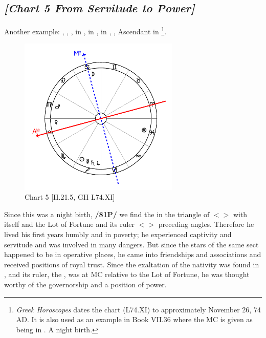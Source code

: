 \subsection*{\textit{[Chart 5 From Servitude to Power]}}

Another example: \Sun, \Mercury, \Saturn, \Jupiter\xspace in \Sagittarius, \Moon\xspace in \Cancer, \Mars\xspace in \Virgo,
\Venus, Ascendant in \Libra
\footnote{\textit{Greek Horoscopes} dates the chart (L74.XI) to approximately November 26, 74 AD. It is also used as an example in Book VII.36 where the MC is given as being in \Cancer. A night birth.}.

\clearpage
\begin{figure}
\centering
\vspace{-20pt}
\includegraphics[width=0.68\textwidth]{charts/2_21_5}
\caption{Chart 5 [II.21.5, GH L74.XI]}
\label{fig:chart05}
\end{figure}

Since this was a night birth, \textbf{/81P/} we find the \Moon\xspace in the triangle of \Mars\xspace $<$\Cancer\xspace \Scorpio\xspace \Pisces$>$ with \Mars\xspace itself and the Lot of Fortune and its ruler $<$\Jupiter$>$ preceding angles.
Therefore he lived his first years humbly and in poverty; he experienced captivity and servitude and was involved in many dangers. But since the stars of the same sect happened to be in operative places, he came into friendships and associations and received positions of royal trust. Since the exaltation of the nativity was found in \Leo, and its ruler, the \Sun, was at MC relative to the Lot of Fortune, he was thought worthy of the governorship and a position of power.
\newpage

